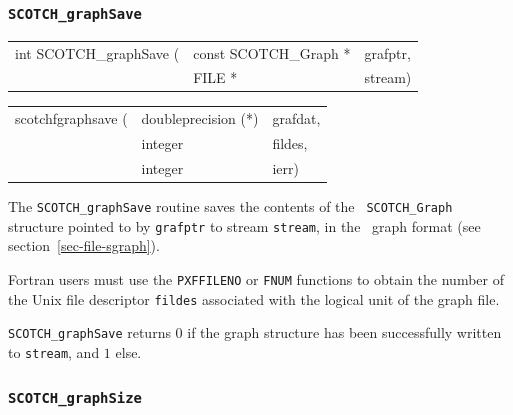 \subsubsection{{\tt SCOTCH\_graphSave}}

\begin{itemize}
\progsyn

{\tt\begin{tabular}{l@{}ll}
int SCOTCH\_graphSave ( & const SCOTCH\_Graph * & grafptr, \\
                        & FILE *                & stream)
\end{tabular}}

{\tt\begin{tabular}{l@{}ll}
scotchfgraphsave ( & doubleprecision (*) & grafdat, \\
                   & integer             & fildes,  \\
                   & integer             & ierr)
\end{tabular}}

\progdes

The {\tt SCOTCH\_graphSave} routine saves the contents of the {\tt
SCOTCH\_\lbt Graph} structure pointed to by {\tt grafptr} to stream
{\tt stream}, in the \scotch\ graph format (see
section~\ref{sec-file-sgraph}).

Fortran users must use the {\tt PXFFILENO} or {\tt FNUM} functions to
obtain the number of the Unix file descriptor {\tt fildes} associated
with the logical unit of the graph file.

\progret

{\tt SCOTCH\_graphSave} returns $0$ if the graph structure has been
successfully written to {\tt stream}, and $1$ else.
\end{itemize}

\subsubsection{{\tt SCOTCH\_graphSize}}


